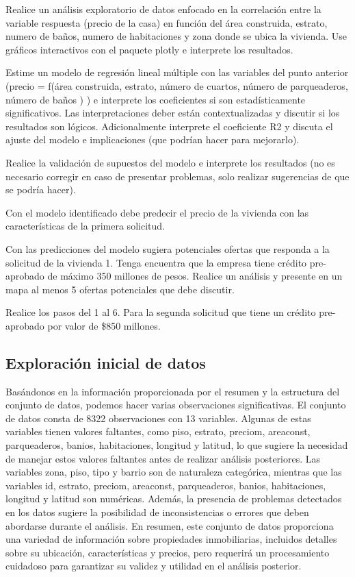 \documentclass[
]{article}
\begin{document}
Realice un análisis exploratorio de datos enfocado en la correlación
entre la variable respuesta (precio de la casa) en función del área
construida, estrato, numero de baños, numero de habitaciones y zona
donde se ubica la vivienda. Use gráficos interactivos con el paquete
plotly e interprete los resultados.

Estime un modelo de regresión lineal múltiple con las variables del
punto anterior (precio = f(área construida, estrato, número de cuartos,
número de parqueaderos, número de baños ) ) e interprete los
coeficientes si son estadísticamente significativos. Las
interpretaciones deber están contextualizadas y discutir si los
resultados son lógicos. Adicionalmente interprete el coeficiente R2 y
discuta el ajuste del modelo e implicaciones (que podrían hacer para
mejorarlo).

Realice la validación de supuestos del modelo e interprete los
resultados (no es necesario corregir en caso de presentar problemas,
solo realizar sugerencias de que se podría hacer).

Con el modelo identificado debe predecir el precio de la vivienda con
las características de la primera solicitud.

Con las predicciones del modelo sugiera potenciales ofertas que responda
a la solicitud de la vivienda 1. Tenga encuentra que la empresa tiene
crédito pre-aprobado de máximo 350 millones de pesos. Realice un
análisis y presente en un mapa al menos 5 ofertas potenciales que debe
discutir.

Realice los pasos del 1 al 6. Para la segunda solicitud que tiene un
crédito pre-aprobado por valor de \$850 millones.

\subsection{Exploración inicial de
datos}\label{exploraciuxf3n-inicial-de-datos}

Basándonos en la información proporcionada por el resumen y la
estructura del conjunto de datos, podemos hacer varias observaciones
significativas. El conjunto de datos consta de 8322 observaciones con 13
variables. Algunas de estas variables tienen valores faltantes, como
piso, estrato, preciom, areaconst, parqueaderos, banios, habitaciones,
longitud y latitud, lo que sugiere la necesidad de manejar estos valores
faltantes antes de realizar análisis posteriores. Las variables zona,
piso, tipo y barrio son de naturaleza categórica, mientras que las
variables id, estrato, preciom, areaconst, parqueaderos, banios,
habitaciones, longitud y latitud son numéricas. Además, la presencia de
problemas detectados en los datos sugiere la posibilidad de
inconsistencias o errores que deben abordarse durante el análisis. En
resumen, este conjunto de datos proporciona una variedad de información
sobre propiedades inmobiliarias, incluidos detalles sobre su ubicación,
características y precios, pero requerirá un procesamiento cuidadoso
para garantizar su validez y utilidad en el análisis posterior.
\end{document}

